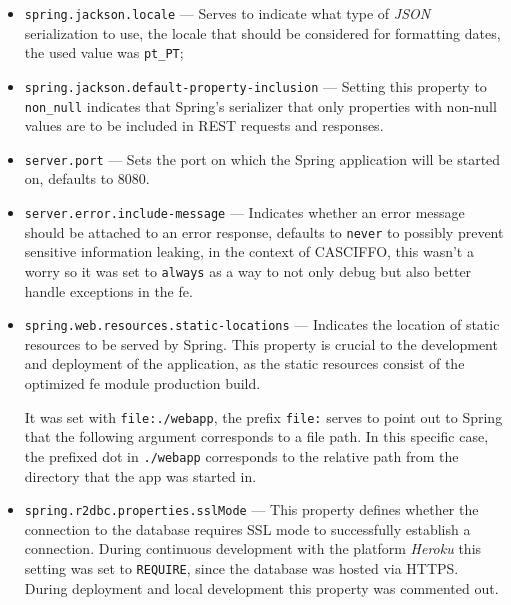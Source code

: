 \begin{itemize}
    \item \lstinline{spring.jackson.locale} --- Serves to indicate what type of \textit{JSON} serialization to use, the locale that should be considered for formatting dates, the used value was \lstinline{pt_PT};
    
    \item \lstinline[keywordstyle=\color{black},commentstyle=\color{black},stringstyle=\color{black}]{spring.jackson.default-property-inclusion} --- Setting this property to \lstinline[keywordstyle=\color{black},commentstyle=\color{black},stringstyle=\color{black}]{non_null} indicates that Spring's serializer that only properties with non-null values are to be included in REST requests and responses.
    
    \item \lstinline{server.port} --- Sets the port on which the Spring application will be started on, defaults to 8080.
    
    \item \lstinline{server.error.include-message} --- Indicates whether an error message should be attached to an error response, defaults to \lstinline{never} to possibly prevent sensitive information leaking, in the context of CASCIFFO, this wasn't a worry so it was set to \lstinline{always} as a way to not only debug but also better handle exceptions in the \acrshort{fe}.
    
    \item \lstinline{spring.web.resources.static-locations} --- Indicates the location of static resources to be served by Spring. This property is crucial to the development and deployment of the application, as the static resources consist of the optimized \acrshort{fe} module production build. 
    
    It was set with \lstinline{file:./webapp}, the prefix \lstinline{file:} serves to point out to Spring that the following argument corresponds to a file path. In this specific case, the prefixed dot in \lstinline{./webapp} corresponds to the relative path from the directory that the app was started in. 
    
    \item \lstinline{spring.r2dbc.properties.sslMode} --- This property defines whether the connection to the database requires SSL mode to successfully establish a connection. During continuous development with the platform \textit{Heroku} this setting was set to \lstinline{REQUIRE}, since the database was hosted via HTTPS. During deployment and local development this property was commented out. 
\end{itemize}   

